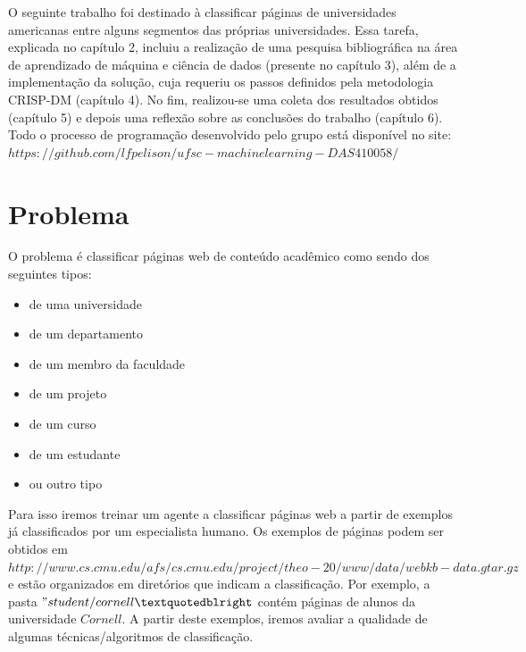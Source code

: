 \documentclass [12pt, a4paper] {article}
\begin{document}
O seguinte trabalho foi destinado à classificar páginas de universidades americanas entre alguns segmentos das próprias universidades. Essa tarefa, explicada no capítulo 2, incluiu a realização de uma pesquisa bibliográfica na área de aprendizado de máquina e ciência de dados (presente no capítulo 3), além de a implementação da solução, cuja requeriu os passos definidos pela metodologia CRISP-DM (capítulo 4). No fim, realizou-se uma coleta dos resultados obtidos (capítulo 5) e depois uma reflexão sobre as conclusões do trabalho (capítulo 6).
Todo o processo de programação desenvolvido pelo grupo está disponível no site: $https://github.com/lfpelison/ufsc-machinelearning-DAS410058/$









\section{Problema}

O problema é classificar páginas web de conteúdo acadêmico como sendo dos seguintes tipos:
\begin{itemize}
    \item de uma universidade
    \item de um departamento
    \item de um membro da faculdade
    \item de um projeto
    \item de um curso
    \item de um estudante
    \item ou outro tipo
\end{itemize}

Para isso iremos treinar um agente a classificar páginas web a partir de exemplos já classificados por um especialista humano. 
Os exemplos de páginas podem ser obtidos em $http://www.cs.cmu.edu/afs/cs.cmu.edu/project/theo-20/www/data/webkb-data.gtar.gz$ e estão organizados em diretórios que indicam a classificação. Por exemplo, a pasta $"student/cornell”$ contém páginas de alunos da universidade $Cornell$. 
A partir deste exemplos, iremos avaliar a qualidade de algumas técnicas/algoritmos de classificação.
\end{document}
